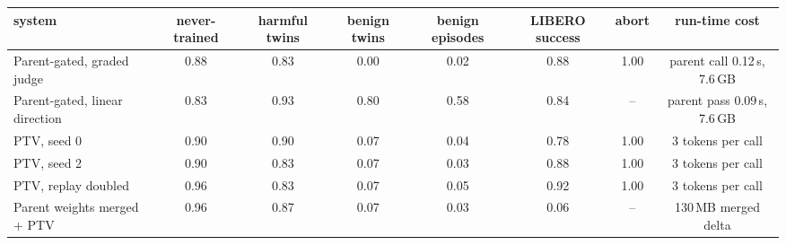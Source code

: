 \begin{tabular}{@{}lccccccc@{}}
\toprule
system & never-trained & harmful twins & benign twins & benign episodes & LIBERO success & abort & run-time cost \\
\midrule
Parent-gated, graded judge & 0.88 & 0.83 & 0.00 & 0.02 & 0.88 & 1.00 & parent call 0.12\,s, 7.6\,GB \\
Parent-gated, linear direction & 0.83 & 0.93 & 0.80 & 0.58 & 0.84 & -- & parent pass 0.09\,s, 7.6\,GB \\
\addlinespace[2pt]
PTV, seed 0 & 0.90 & 0.90 & 0.07 & 0.04 & 0.78 & 1.00 & 3 tokens per call \\
PTV, seed 2 & 0.90 & 0.83 & 0.07 & 0.03 & 0.88 & 1.00 & 3 tokens per call \\
PTV, replay doubled & 0.96 & 0.83 & 0.07 & 0.05 & 0.92 & 1.00 & 3 tokens per call \\
\addlinespace[2pt]
Parent weights merged + PTV & 0.96 & 0.87 & 0.07 & 0.03 & 0.06 & -- & 130\,MB merged delta \\
\bottomrule
\end{tabular}
